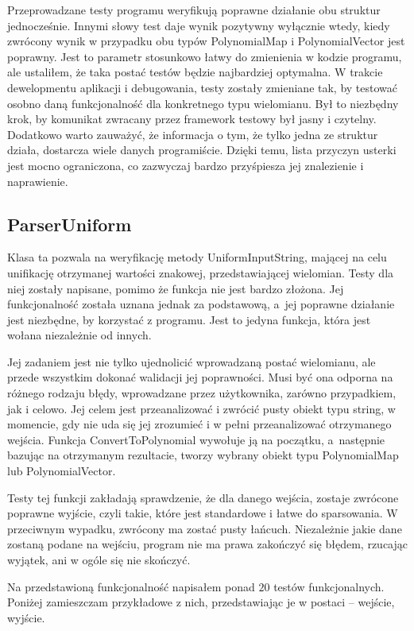 Przeprowadzane testy programu weryfikują poprawne działanie obu struktur jednocześnie. Innymi słowy test daje wynik pozytywny wyłącznie wtedy, kiedy zwrócony wynik w przypadku obu typów PolynomialMap i PolynomialVector jest poprawny. Jest to parametr stosunkowo łatwy do zmienienia w kodzie programu, ale ustaliłem, że taka postać testów będzie najbardziej optymalna. W trakcie dewelopmentu aplikacji i debugowania, testy zostały zmieniane tak, by testować osobno daną funkcjonalność dla konkretnego typu wielomianu. Był to niezbędny krok, by komunikat zwracany przez framework testowy był jasny i czytelny. Dodatkowo warto zauważyć, że informacja o tym, że tylko jedna ze struktur działa, dostarcza wiele danych programiście. Dzięki temu, lista przyczyn usterki jest mocno ograniczona, co zazwyczaj bardzo przyśpiesza jej znalezienie i naprawienie.

\subsection{ParserUniform}

Klasa ta pozwala na weryfikację metody UniformInputString, mającej na celu unifikację otrzymanej wartości znakowej, przedstawiającej wielomian. Testy dla niej zostały napisane, pomimo że funkcja nie jest bardzo złożona. Jej funkcjonalność została uznana jednak za podstawową, a~jej poprawne działanie jest niezbędne, by korzystać z programu. Jest to jedyna funkcja, która jest wołana niezależnie od innych.

Jej zadaniem jest nie tylko ujednolicić wprowadzaną postać wielomianu, ale przede wszystkim dokonać walidacji jej poprawności. Musi być ona odporna na różnego rodzaju błędy, wprowadzane przez użytkownika, zarówno przypadkiem, jak i celowo. Jej celem jest przeanalizować i zwrócić pusty obiekt typu string, w momencie, gdy nie uda się jej zrozumieć i w pełni przeanalizować otrzymanego wejścia. Funkcja ConvertToPolynomial wywołuje ją na początku, a~następnie bazując na otrzymanym rezultacie, tworzy wybrany obiekt typu PolynomialMap lub PolynomialVector.

Testy tej funkcji zakładają sprawdzenie, że dla danego wejścia, zostaje zwrócone poprawne wyjście, czyli takie, które jest standardowe i łatwe do sparsowania. W przeciwnym wypadku, zwrócony ma zostać pusty łańcuch. Niezależnie jakie dane zostaną podane na wejściu, program nie ma prawa zakończyć się błędem, rzucając wyjątek, ani w ogóle się nie skończyć.

Na przedstawioną funkcjonalność napisałem ponad $20$ testów funkcjonalnych. Poniżej zamieszczam przykładowe z nich, przedstawiając je w postaci -- wejście, wyjście. 


